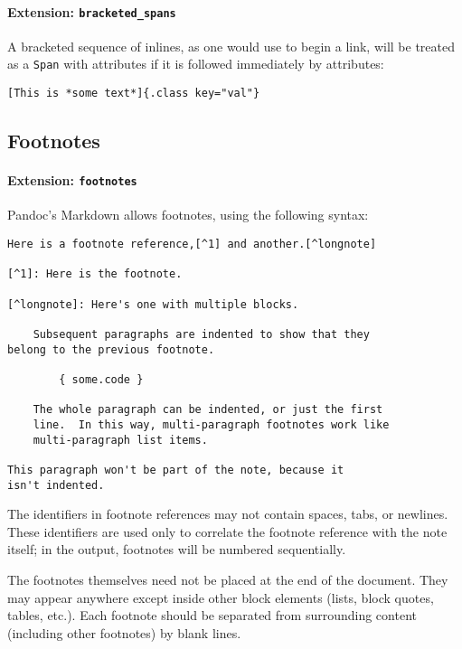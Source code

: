 \documentclass[
]{article}
\begin{document}
\paragraph{\texorpdfstring{Extension:
\texttt{bracketed\_spans}}{Extension: bracketed\_spans}}\label{extension-bracketed_spans}

A bracketed sequence of inlines, as one would use to begin a link, will
be treated as a \texttt{Span} with attributes if it is followed
immediately by attributes:

\begin{verbatim}
[This is *some text*]{.class key="val"}
\end{verbatim}

\subsection{Footnotes}\label{footnotes}

\paragraph{\texorpdfstring{Extension:
\texttt{footnotes}}{Extension: footnotes}}\label{extension-footnotes}

Pandoc's Markdown allows footnotes, using the following syntax:

\begin{verbatim}
Here is a footnote reference,[^1] and another.[^longnote]

[^1]: Here is the footnote.

[^longnote]: Here's one with multiple blocks.

    Subsequent paragraphs are indented to show that they
belong to the previous footnote.

        { some.code }

    The whole paragraph can be indented, or just the first
    line.  In this way, multi-paragraph footnotes work like
    multi-paragraph list items.

This paragraph won't be part of the note, because it
isn't indented.
\end{verbatim}

The identifiers in footnote references may not contain spaces, tabs, or
newlines. These identifiers are used only to correlate the footnote
reference with the note itself; in the output, footnotes will be
numbered sequentially.

The footnotes themselves need not be placed at the end of the document.
They may appear anywhere except inside other block elements (lists,
block quotes, tables, etc.). Each footnote should be separated from
surrounding content (including other footnotes) by blank lines.
\end{document}
